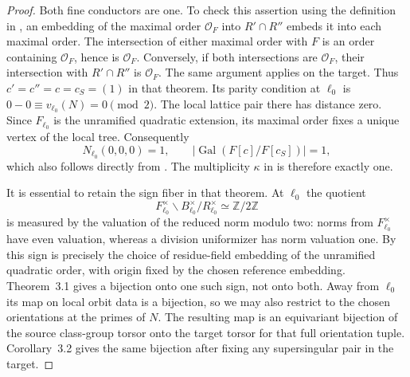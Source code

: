 \documentclass[11pt]{article}
\theoremstyle{definition}
\theoremstyle{remark}
\newcommand{\Z}{\mathbb Z}
\begin{document}
\begin{proof}
Both fine conductors are one. To check this assertion using the
definition in \cite[\S3.3]{cornutjetchev}, an embedding of the maximal
order $\mathcal O_F$ into $R'\cap R''$ embeds it into each maximal
order. The intersection of either maximal order with $F$ is an order
containing $\mathcal O_F$, hence is $\mathcal O_F$. Conversely,
if both intersections are $\mathcal O_F$, their intersection with
$R'\cap R''$ is $\mathcal O_F$. The same argument applies on the
target. Thus $c'=c''=c=c_S=(1)$ in that theorem. Its parity
condition at $\ell_0$ is $0-0\equiv v_{\ell_0}(N)=0\pmod2$.
The local lattice pair there has distance zero. Since $F_{\ell_0}$
is the unramified quadratic extension, its maximal order fixes a
unique vertex of the local tree. Consequently
\[
 N_{\ell_0}(0,0,0)=1,\qquad
 |\operatorname{Gal}(F[c]/F[c_S])|=1,
\]
which also follows directly from
\cite[Lemma~2.1(ii)]{cornutjetchev}. The multiplicity $\kappa$ in
\cite[Theorem~3.1]{cornutjetchev} is therefore exactly one.

It is essential to retain the sign fiber in that theorem. At $\ell_0$
the quotient
\[
 F_{\ell_0}^{\times}\backslash B_{\ell_0}^{\times}/R_{\ell_0}^{\times}
       \simeq\Z/2\Z
\]
is measured by the valuation of the reduced norm modulo two:
norms from $F_{\ell_0}^{\times}$ have even valuation, whereas a
division uniformizer has norm valuation one.
By \cite[\S3.6]{cornutjetchev} this sign is precisely the choice of
residue-field embedding of the unramified quadratic order, with
origin fixed by the chosen reference embedding. Theorem~3.1 gives
a bijection onto one such sign, not onto both. Away from $\ell_0$
its map on local orbit data is a bijection, so we may also restrict
to the chosen orientations at the primes of $N$. The resulting
map is an equivariant bijection of the source class-group torsor
onto the target torsor for that full orientation tuple. Corollary~3.2
gives the same bijection after fixing any supersingular pair in the
target.


\end{proof}
\end{document}
